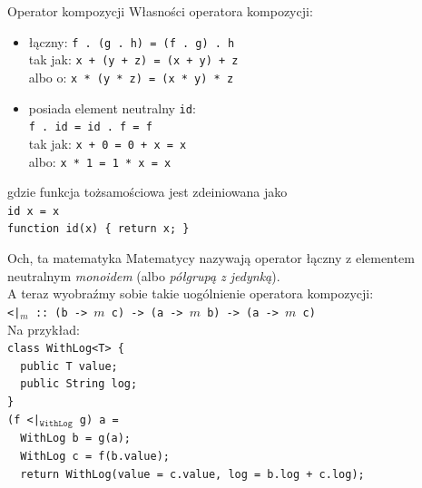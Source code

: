 \documentclass{beamer}
\begin{document}
\begin{frame}{Operator kompozycji}
  Własności operatora kompozycji: \pause
  \begin{itemize}
  \item łączny: \texttt{f .\ (g .\ h) = (f .\ g) .\ h} \\ \pause
    tak jak: \texttt{x + (y + z) = (x + y) + z} \\ \pause
    albo o: \texttt{x * (y * z) = (x * y) * z} \pause
  \item posiada element neutralny \texttt{id}: \\ \pause
    \texttt{f .\ id = id .\ f = f} \\ \pause
    tak jak: \texttt{x + 0 = 0 + x = x} \\ \pause
    albo: \texttt{x * 1 = 1 * x = x} \pause
  \end{itemize}
  gdzie funkcja tożsamościowa jest zdeiniowana jako\\
  \texttt{id x = x} \\ \pause
  \texttt{function id(x) \{ return x; \}}
\end{frame}


\begin{frame}{Och, ta matematyka}
  Matematycy nazywają operator łączny z elementem neutralnym \textit{monoidem}
  (albo \textit{półgrupą z jedynką}). \\ \pause
  A teraz wyobraźmy sobie takie uogólnienie operatora kompozycji: \\ \pause
  \texttt{<|$_m$ ::\ (b -> $m$ c) -> (a -> $m$ b) -> (a -> $m$ c)} \\ \pause
  Na przykład: \\
  \texttt{class WithLog<T> \{ \\
    \ \ public T value; \\
    \ \ public String log; \\
    \}} \\ \pause
  \texttt{(f <|$_\mathtt{WithLog}$ g) a = \\
    \ \ WithLog b = g(a); \\
    \ \ WithLog c = f(b.value); \\
    \ \ return WithLog(value = c.value, log = b.log + c.log); }
\end{frame}
\end{document}
